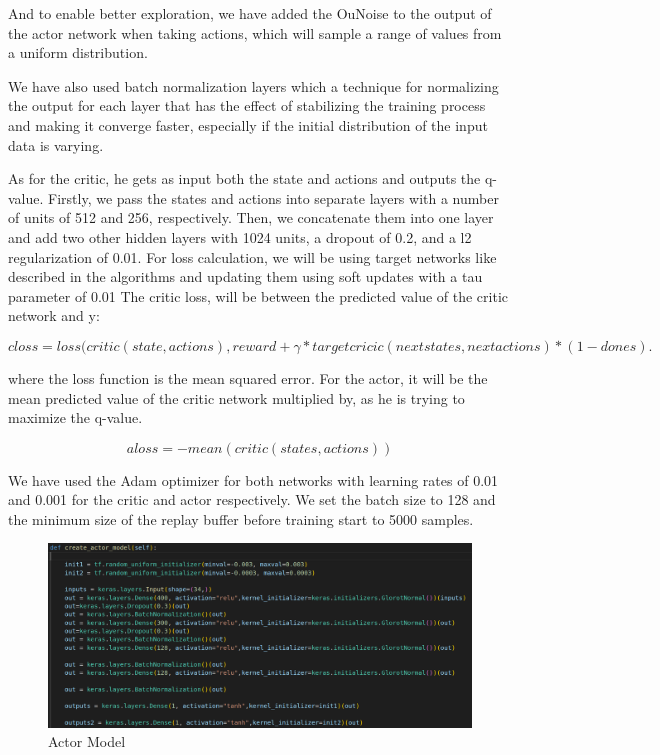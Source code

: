 \documentclass[12pt]{extarticle}
\begin{document}
And to enable better exploration, we have added the OuNoise to the output of the actor network when taking actions, which will sample a range of values from a uniform distribution.


We have also used batch normalization layers \cite{ioffe2015batch} which a technique for normalizing the output for each layer that has the effect of stabilizing the training process and making it converge faster, especially if the initial distribution of the input data is varying.

As for the critic, he gets as input both the state and actions and outputs the q-value. Firstly, we pass the states and actions into separate layers with a number of units of 512 and 256, respectively. Then, we concatenate them into one layer and add two other hidden layers with 1024 units, a dropout of 0.2, and a l2 regularization of 0.01.
For loss calculation, we will be using target networks like described in the algorithms and updating them using soft updates with a tau parameter of 0.01
The critic loss, will be between the predicted value of the critic network and y:
 

     \begin{equation} \label{critic_loss}
     closs= loss(critic(state,actions),reward+ \gamma*targetcricic(nextstates,nextactions)*(1-dones).
   \end{equation}
 
where the loss function is the mean squared error.
For the actor, it will be the mean predicted value of the critic network multiplied by, as he is trying to maximize the q-value.

\begin{equation} \label{actor_loss}
     aloss= -mean(critic(states,actions))
   \end{equation}
   
We have used the Adam optimizer for both networks with learning rates of 0.01 and 0.001 for the critic and actor respectively. We set the batch size to 128 and the minimum size of the replay buffer before training start to 5000 samples.


 \begin{figure}[h]  
\centering
\includegraphics[scale=0.35]{actor_model}
\caption[Actor model]{Actor Model}
\end{figure}
\end{document}
